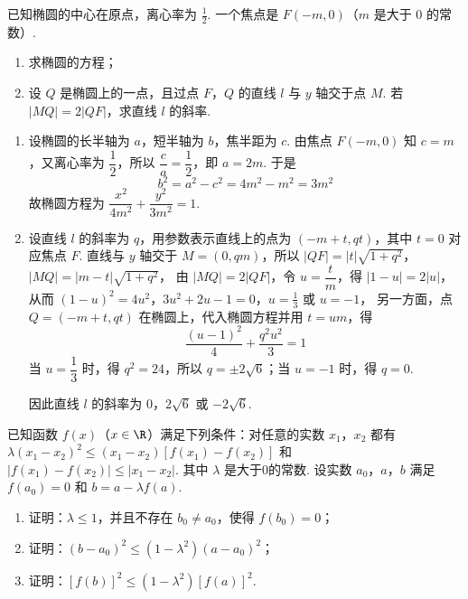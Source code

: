 \begin{problem}
已知椭圆的中心在原点，离心率为 \(\frac{1}{2}\). 一个焦点是 \(F(-m,0)\)（\(m\) 是大于 \(0\) 的常数）.

\begin{enumerate}
\item 求椭圆的方程；
\item 设 \(Q\) 是椭圆上的一点，且过点 \(F\)，\(Q\) 的直线 \(l\) 与 \(y\) 轴交于点 \(M\). 若 \(\left|MQ\right| = 2\left|QF\right|\)，求直线 \(l\) 的斜率.
\end{enumerate}
\end{problem}

\begin{solution}
\begin{enumerate}
\item 设椭圆的长半轴为 \(a\)，短半轴为 \(b\)，焦半距为 \(c\). 由焦点 \(F(-m,0)\) 知 \(c=m\)，又离心率为 \(\dfrac12\)，所以 \(\dfrac ca=\dfrac12\)，即 \(a=2m\). 于是
\[
b^2=a^2-c^2=4m^2-m^2=3m^2
\]
故椭圆方程为 \(\dfrac{x^2}{4m^2}+\dfrac{y^2}{3m^2}=1\).

\item 设直线 \(l\) 的斜率为 \(q\)，用参数表示直线上的点为 \((-m+t,qt)\)，其中 \(t=0\) 对应焦点 \(F\). 直线与 \(y\) 轴交于 \(M=(0,qm)\)，所以
\(|QF|=|t|\sqrt{1+q^2}\)，\(|MQ|=|m-t|\sqrt{1+q^2}\)，
由 \(|MQ|=2|QF|\)，令 \(u=\dfrac tm\)，得 \(|1-u|=2|u|\)，从而
\((1-u)^2=4u^2\)，\(3u^2+2u-1=0\)，\(u=\frac13\text{ 或 }u=-1\)，
另一方面，点 \(Q=(-m+t,qt)\) 在椭圆上，代入椭圆方程并用 \(t=um\)，得
\[
\frac{(u-1)^2}{4}+\frac{q^2u^2}{3}=1
\]
当 \(u=\dfrac13\) 时，得 \(q^2=24\)，所以 \(q=\pm2\sqrt6\)；当 \(u=-1\) 时，得 \(q=0\).

因此直线 \(l\) 的斜率为 \(0\)，\(2\sqrt6\) 或 \(-2\sqrt6\).
\end{enumerate}
\end{solution}

\begin{problem}
已知函数 \(f(x)\)（\(x \in \R\)）满足下列条件：对任意的实数 \(x_1\)，\(x_2\) 都有 \(\lambda(x_1 - x_2)^2 \leqslant (x_1 - x_2)[f(x_1) - f(x_2)]\) 和 \(|f(x_1) - f(x_2)| \leqslant |x_1 - x_2|\). 其中 \(\lambda\) 是大于\(0\)的常数. 设实数 \(a_0\)，\(a\)，\(b\) 满足 \(f(a_0) = 0\) 和 \(b = a - \lambda f(a)\).

\begin{enumerate}
\item 证明：\(\lambda \leqslant 1\)，并且不存在 \(b_0 \neq a_0\)，使得 \(f(b_0) = 0\)；
\item 证明：\((b - a_0)^2\leqslant (1 - \lambda^2)(a - a_0)^2\)；
\item 证明：\([f(b)]^{2}\leqslant(1-\lambda^{2})[f(a)]^{2}\).
\end{enumerate}
\end{problem}

